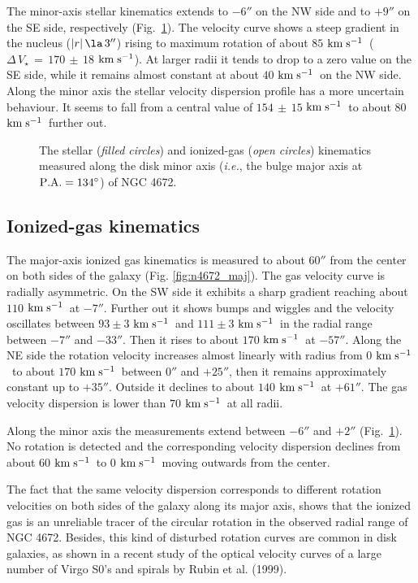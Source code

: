 \documentclass[twocolumns]{aa}
\def\kms{$\rm km\;s^{-1}$}
\def\dg{^\circ}
\begin{document}
The minor-axis stellar kinematics extends to $-6''$ on the NW side and
to $+9''$ on the SE side, respectively (Fig.~\ref{fig:n4672_min}).
The velocity curve shows a steep gradient in the nucleus
($|r|\,\la\,3''$) rising to maximum rotation of about $85$ \kms\
($\Delta\,V_\star\,=\,170\,\pm\,18$ \kms). At larger radii it tends
to drop to a zero value on the SE side, while it remains almost
constant at about $40$ \kms\  on the NW side. Along the minor axis the
stellar velocity dispersion profile has a more uncertain behaviour. It
seems to fall from a central value of $154\,\pm\,15$ \kms\ to about
$80$ \kms\ further out.


\begin{figure}[ht]
\vspace*{6.5cm}
\caption[]{The stellar ({\it filled circles\/}) and ionized-gas ({\it open circles})
  kinematics measured along the disk minor axis 
  ({\it i.e.\/}, the bulge major axis at $\rm P.A.=134\dg$) of NGC 4672.}
\label{fig:n4672_min}
\end{figure}

\subsection{Ionized-gas kinematics}
 
The major-axis ionized gas kinematics is measured to ab\-out $60''$ from
the center on both sides of the galaxy
(Fig. \ref{fig:n4672_maj}). The gas velocity curve is radially
asymmetric.  On the SW side it exhibits a sharp gradient reaching
about $110$ \kms\ at $-7''$. Further out it shows bumps and wiggles
and the velocity oscillates between $93 \pm 3$ \kms\ and $111
\pm 3$ \kms\ in the radial range between $-7''$ and $-33''$. Then it
rises to about $170$ \kms\ at $-57''$.  Along the NE side the rotation
velocity increases almost linearly with radius from $0$ \kms\ to about
$170$ \kms\ between $0''$ and $+25''$, then it remains approximately
constant up to $+35''$. Outside it declines to about $140$ \kms\ at
$+61''$.  The gas velocity dispersion is lower than $70$ \kms\ at all radii.

Along the minor axis the measurements extend between $-6''$ and $+2''$
(Fig.~\ref{fig:n4672_min}).  No rotation is detected and the
corresponding velocity dispersion declines from about $60$ \kms\ to
$0$ \kms\ moving outwards from the center.

The fact that the same velocity dispersion corresponds to different
rotation velocities on both sides of the galaxy along its major
axis, shows that the ionized gas is an unreliable tracer of the
circular rotation in the observed radial range of NGC 4672.  Besides,
this kind of disturbed rotation curves are common in disk galaxies, as
shown in a recent study of the optical velocity curves of a
large number of Virgo S0's and spirals by Rubin et al.
(1999).
\end{document}
